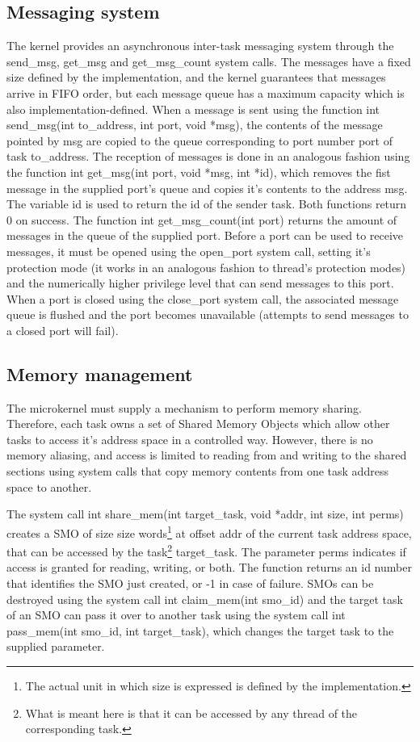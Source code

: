 \documentclass[12pt, letterpaper, oneside, english]{article}
\begin{document}
\subsection{Messaging system}
The kernel provides an asynchronous inter-task messaging system through the \textsf{send\_msg}, \textsf{get\_msg} and \textsf{get\_msg\_count} system calls. The messages have a fixed size defined by the implementation, and the kernel guarantees that messages arrive in FIFO order, but each message queue has a maximum capacity which is also implementation-defined. When a message is sent using the function \textsf{int send\_msg(int to\_address, int port, void *msg)}, the contents of the message pointed by \textsf{msg} are copied to the queue corresponding to port number \textsf{port} of task \textsf{to\_address}. The reception of messages is done in an analogous fashion using the function \textsf{int get\_msg(int port, void *msg, int *id)}, which removes the fist message in the supplied \textsf{port}'s queue and copies it's contents to the address \textsf{msg}. The variable \textsf{id} is used to return the id of the sender task. Both functions return 0 on success. 
The function \textsf{int get\_msg\_count(int port)} returns the amount of messages in the queue of the supplied port.
Before a port can be used to receive messages, it must be opened using the \textsf{open\_port} system call, setting it's protection mode (it works in an analogous fashion to thread's protection modes) and the numerically higher privilege level that can send messages to this port. When a port is closed using the \textsf{close\_port} system call, the associated message queue is flushed and the port becomes unavailable (attempts to send messages to a closed port will fail). 

\subsection{Memory management}
The microkernel must supply a mechanism to perform memory sharing. Therefore, each task owns a set of Shared Memory Objects which allow other tasks to access it's address space in a controlled way. However, there is no memory aliasing, and access is limited to reading from and writing to the shared sections using system calls that copy memory contents from one task address space to another.

The system call \textsf{int share\_mem(int target\_task, void *addr, int size, int perms)} creates a SMO of size \textsf{size} words\footnote{The actual unit in which size is expressed is defined by the implementation.} at offset \textsf{addr} of the current task address space, that can be accessed by the task\footnote{What is meant here is that it can be accessed by any thread of the corresponding task.} \textsf{target\_task}. The parameter \textsf{perms} indicates if access is granted for reading, writing, or both. The function returns an id number that identifies the SMO just created, or -1 in case of failure. SMOs can be destroyed using the system call \textsf{int claim\_mem(int smo\_id)} and the target task of an SMO can pass it over to another task using the system call \textsf{int pass\_mem(int smo\_id, int target\_task)}, which changes the target task to the supplied parameter.
\end{document}
